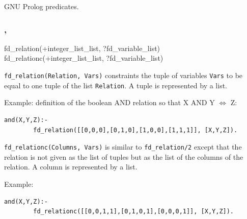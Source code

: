 \Portability

GNU Prolog predicates.

\subsubsection{,
               }

\begin{TemplatesOneCol}
fd\_relation(+integer\_list\_list, ?fd\_variable\_list)\\
fd\_relationc(+integer\_list\_list, ?fd\_variable\_list)

\end{TemplatesOneCol}

\Description

\texttt{fd\_relation(Relation, Vars)} constraints the tuple of variables
\texttt{Vars} to be equal to one tuple of the list \texttt{Relation}. A
tuple is represented by a list.

Example: definition of the boolean AND relation so that X AND Y
$\Leftrightarrow$ Z:

\begin{Code}
\begin{verbatim}
and(X,Y,Z):-
        fd_relation([[0,0,0],[0,1,0],[1,0,0],[1,1,1]], [X,Y,Z]).
\end{verbatim}
\end{Code}

\texttt{fd\_relationc(Columns, Vars)} is similar to \texttt{fd\_relation/2}
except that the relation is not given as the list of tuples but as the list
of the columns of the relation. A column is represented by a list.

Example:

\begin{Code}
\begin{verbatim}
and(X,Y,Z):-
        fd_relationc([[0,0,1,1],[0,1,0,1],[0,0,0,1]], [X,Y,Z]).
\end{verbatim}
\end{Code}

\begin{PlErrors}







\end{PlErrors}

